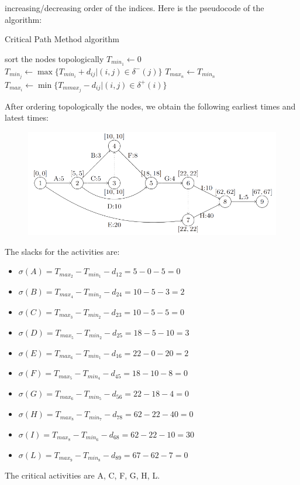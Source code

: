\documentclass[12pt, a4paper]{report}
\newtheorem[style=M,bodystyle=\normalfont]{theorem}{Theorem}
\newtheorem[style=M,bodystyle=\normalfont]{corollary}{Corollary}
\newtheorem[style=M,bodystyle=\normalfont]{lemma}{Lemma}
\newtheorem[style=M,bodystyle=\normalfont]{definition}{Definition}
\begin{document}
        increasing/decreasing order of the indices. Here is the pseudocode of the algorithm:
        \begin{algorithm}[H]
            \caption{Critical Path Method algorithm}
                \begin{algorithmic}[1]
                    \State sort the nodes topologically
                    \State $T_{min_1} \leftarrow 0$
                        \State $T_{min_j} \leftarrow \max\{T_{min_i} + d_{ij} | (i, j) \in \delta^{-}(j)\}$
                    \EndFor
                    \State $T_{max_n} \leftarrow T_{min_n}$
                    \State $T_{max_i} \leftarrow \min\{T_{mmax_j} - d_{ij} | (i, j) \in \delta^{+}(i)\}$
                \EndFor
                \end{algorithmic}
        \end{algorithm}
        After ordering topologically the nodes, we obtain the following earliest times and latest times:
        \begin{figure}[H]
            \centering
            \includegraphics[width=0.9\linewidth]{images/prog2.png}
        \end{figure}
        The slacks for the activities are: 
        \begin{itemize}
            \item $\sigma(A) = T_{max_2} - T_{min_1} - d_{12} = 5 - 0 - 5 = 0$
            \item $\sigma(B) = T_{max_4} - T_{min_2} - d_{24} = 10 - 5 - 3 = 2$
            \item $\sigma(C) = T_{max_3} - T_{min_2} - d_{23} = 10 - 5 - 5 = 0$
            \item $\sigma(D) = T_{max_5} - T_{min_2} - d_{25} = 18 - 5 - 10 = 3$
            \item $\sigma(E) = T_{max_6} - T_{min_1} - d_{16} = 22 - 0 - 20 = 2$
            \item $\sigma(F) = T_{max_5} - T_{min_4} - d_{45} = 18 - 10 - 8 = 0$
            \item $\sigma(G) = T_{max_6} - T_{min_5} - d_{56} = 22 - 18 - 4 = 0$
            \item $\sigma(H) = T_{max_8} - T_{min_7} - d_{78} = 62 - 22 - 40 = 0$
            \item $\sigma(I) = T_{max_8} - T_{min_6} - d_{68} = 62 - 22 - 10 = 30$
            \item $\sigma(L) = T_{max_9} - T_{min_8} - d_{89} = 67 - 62 - 7 = 0$
        \end{itemize}
        The critical activities are A, C, F, G, H, L.
\end{document}

